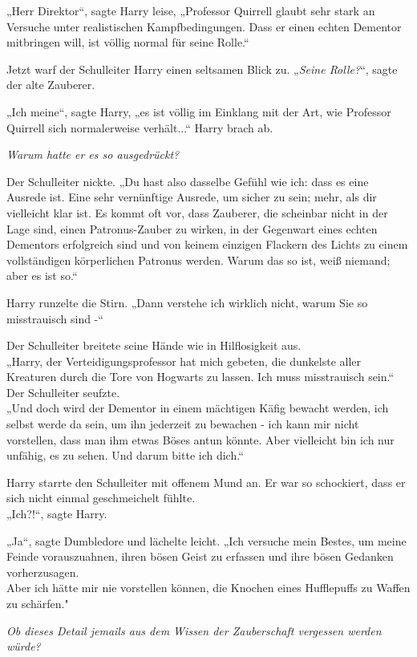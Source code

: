 {„Herr Direktor“, sagte Harry leise, „Professor Quirrell glaubt sehr stark an Versuche unter realistischen Kampfbedingungen. Dass er einen echten Dementor mitbringen will, ist völlig normal für seine Rolle.“

Jetzt warf der Schulleiter Harry einen seltsamen Blick zu. „\emph{Seine Rolle?}“, sagte der alte Zauberer.

„Ich meine“, sagte Harry, „es ist völlig im Einklang mit der Art, wie Professor Quirrell sich normalerweise verhält...“ Harry brach ab.

\emph{Warum hatte er es so ausgedrückt?}

Der Schulleiter nickte. „Du hast also dasselbe Gefühl wie ich: dass es eine Ausrede ist. Eine sehr vernünftige Ausrede, um sicher zu sein; mehr, als dir vielleicht klar ist. Es kommt oft vor, dass Zauberer, die scheinbar nicht in der Lage sind, einen Patronus-Zauber zu wirken, in der Gegenwart eines echten Dementors erfolgreich sind und von keinem einzigen Flackern des Lichts zu einem vollständigen körperlichen Patronus werden. Warum das so ist, weiß niemand; aber es ist so.“

Harry runzelte die Stirn. „Dann verstehe ich wirklich nicht, warum Sie so misstrauisch sind -“

Der Schulleiter breitete seine Hände wie in Hilflosigkeit aus.\\ „Harry, der Verteidigungsprofessor hat mich gebeten, die dunkelste aller Kreaturen durch die Tore von Hogwarts zu lassen. Ich muss misstrauisch sein.“\\ Der Schulleiter seufzte.\\ „Und doch wird der Dementor in einem mächtigen Käfig bewacht werden, ich selbst werde da sein, um ihn jederzeit zu bewachen - ich kann mir nicht vorstellen, dass man ihm etwas Böses antun könnte. Aber vielleicht bin ich nur unfähig, es zu sehen. Und darum bitte ich dich.“

Harry starrte den Schulleiter mit offenem Mund an. Er war so schockiert, dass er sich nicht einmal geschmeichelt fühlte.\\ „Ich?!“, sagte Harry.

„Ja“, sagte Dumbledore und lächelte leicht. „Ich versuche mein Bestes, um meine Feinde vorauszuahnen, ihren bösen Geist zu erfassen und ihre bösen Gedanken vorherzusagen.\\ Aber ich hätte mir nie vorstellen können, die Knochen eines Hufflepuffs zu Waffen zu schärfen."

\emph{Ob dieses Detail jemails aus dem Wissen der Zauberschaft vergessen werden würde?}

}

